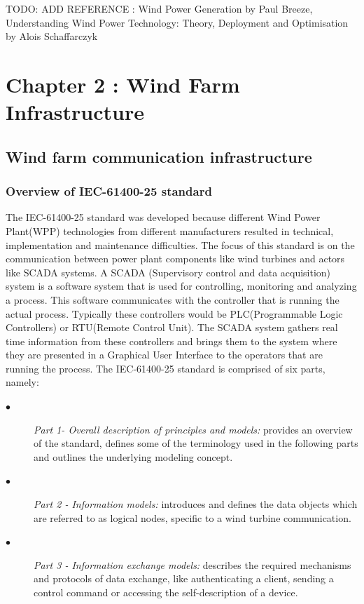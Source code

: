 \documentclass[twosided,a4,10pt]{article}
\begin{document}
\begin{multicols}{2}
\begin{description}
TODO: ADD REFERENCE : Wind Power Generation by Paul Breeze, Understanding Wind Power Technology: Theory, Deployment and Optimisation by Alois Schaffarczyk 
\end{description}

\section{Chapter 2 : Wind Farm Infrastructure }
 \subsection{Wind farm communication infrastructure}
  \subsubsection{Overview of IEC-61400-25 standard}
  	The IEC-61400-25 standard was developed because different Wind Power Plant(WPP) technologies from different manufacturers resulted in technical, implementation and maintenance difficulties. The focus of this standard is on the communication between power plant components like wind turbines and actors like SCADA systems. A SCADA (Supervisory control and data acquisition) system is a software system that is used for controlling, monitoring and analyzing a process. This software communicates with the controller that is running the actual process. Typically these controllers would be PLC(Programmable Logic Controllers) or RTU(Remote Control Unit). The SCADA system gathers real time information from these controllers and brings them to the system where they are presented in a Graphical User Interface to the operators that are running the process. The IEC-61400-25 standard is comprised of six parts, namely: 
  	\begin{description}
  		\item[$\bullet$] 
  			\textit{Part 1- Overall description of principles and models:} provides an overview of the standard, defines some of the terminology used in the following parts and outlines the underlying modeling concept.
  		\item[$\bullet$] 
  			\textit{Part 2 - Information models:} introduces and defines the data objects which are referred to as logical nodes, specific to a wind turbine communication.
  		\item[$\bullet$] 
  			\textit{Part 3 - Information exchange models:} describes the required mechanisms and protocols of data exchange, like authenticating a client, sending a control command or accessing the self-description of a device.

\end{description}
\end{multicols}
\end{document}
